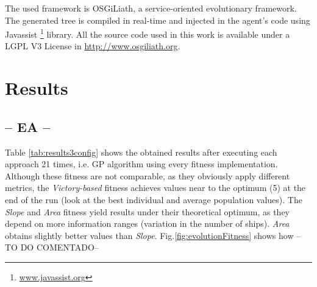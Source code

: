 \documentclass[preprint]{elsarticle}
\begin{document}


The used framework is OSGiLiath, a service-oriented evolutionary framework. %
The generated tree is compiled in real-time and injected in the agent's code using Javassist \footnote{\url{www.javassist.org}} library. All the source code used in this work is available under a LGPL V3 License in \url{http://www.osgiliath.org}.


\section{Results}
\label{sec:results}
\subsection{-- EA --}

Table \ref{tab:results3config} shows the obtained results after
executing each approach 21 times, i.e. GP algorithm using every fitness implementation. 
Although these fitness are not comparable, as they obviously apply different metrics, the \textit{Victory-based} fitness achieves values near to the optimum (5) at the end of the run (look at the best individual and average population values). The \textit{Slope} and \textit{Area} fitness yield results under their theoretical optimum, 
as they depend on more information ranges (variation in the number of ships).
\textit{Area} obtains slightly better values than \textit{Slope}. Fig.\ref{fig:evolutionFitness} shows how --TO DO COMENTADO-- %

\end{document}
